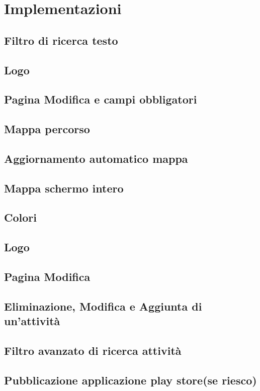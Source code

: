 \section{Implementazioni}

\subsection{Filtro di ricerca testo}

\subsection{Logo}

\subsection{Pagina Modifica e campi obbligatori}

\subsection{Mappa percorso}

\subsection{Aggiornamento automatico mappa}

\subsection{Mappa schermo intero}

\subsection{Colori}

\subsection{Logo}

\subsection{Pagina Modifica}

\subsection{Eliminazione, Modifica e Aggiunta di un'attività}

\subsection{Filtro avanzato di ricerca attività}

\subsection{Pubblicazione applicazione play store(se riesco)}


